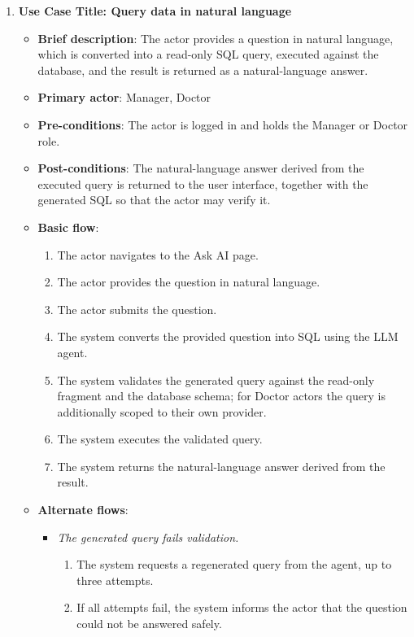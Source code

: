 \begin{enumerate}
\vspace{0.5em}

\item \textbf{Use Case Title: Query data in natural language}
\begin{itemize}
    \item \textbf{Brief description}: The actor provides a question in natural language, which is converted into a read-only SQL query, executed against the database, and the result is returned as a natural-language answer.
    \item \textbf{Primary actor}: Manager, Doctor
    \item \textbf{Pre-conditions}: The actor is logged in and holds the Manager or Doctor role.
    \item \textbf{Post-conditions}: The natural-language answer derived from the executed query is returned to the user interface, together with the generated SQL so that the actor may verify it.
    \item \textbf{Basic flow}:
    \begin{enumerate}
        \item The actor navigates to the Ask AI page.
        \item The actor provides the question in natural language.
        \item The actor submits the question.
        \item The system converts the provided question into SQL using the LLM agent.
        \item The system validates the generated query against the read-only fragment and the database schema; for Doctor actors the query is additionally scoped to their own provider.
        \item The system executes the validated query.
        \item The system returns the natural-language answer derived from the result.
    \end{enumerate}
    \item \textbf{Alternate flows}:
    \begin{itemize}
        \item[5a.] \textit{The generated query fails validation.}
        \begin{enumerate}
            \item The system requests a regenerated query from the agent, up to three attempts.
            \item If all attempts fail, the system informs the actor that the question could not be answered safely.
        \end{enumerate}
    \end{itemize}
\end{itemize}


\end{enumerate}
